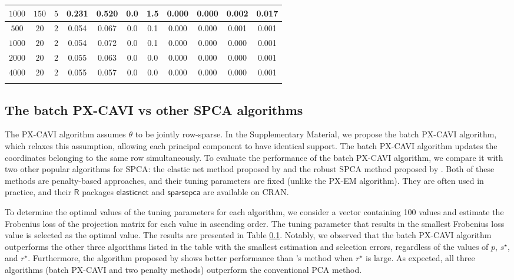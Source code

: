 \documentclass[pdftex, noinfoline, letter]{imsart}
\theoremstyle{plain}
\begin{document}
\begin{table}[h!]
\begin{adjustwidth}{-.9in}{-.9in}
{\begin{tabular}{ccc|cc|cc|cc|cc}
    $1000$ & $150$ & $5$ &
    0.231 & 0.520  &
    0.0 &  1.5 &
    0.000 & 0.000 & 0.002 & 0.017\\   
\hline 
    $500$ & $20$ & $2$  &
    0.054 & 0.067 &
    0.0 &  0.1 &
    0.000 & 0.000 & 0.001 & 0.001\\
    $1000$ & $20$ & $2$ &
    0.054 & 0.072 &
    0.0 &  0.1 &
    0.000 & 0.000 & 0.000 & 0.001\\
    $2000$ & $20$ & $2$ &
    0.055 & 0.063 &
    0.0 &  0.0  & 
    0.000 & 0.000 & 0.000 & 0.001\\
    $4000$ & $20$ & $2$  &
    0.055 & 0.057 &
    0.0 & 0.0 & 
    0.000 & 0.000 & 0.000 & 0.001\\
\Xhline{2\arrayrulewidth}    
\end{tabular}  
}
\end{adjustwidth}
\end{table}



\subsection{The batch PX-CAVI vs other SPCA algorithms}
\label{sim-3}
The PX-CAVI algorithm assumes $\theta$ to be jointly row-sparse. In the Supplementary Material, we propose the batch PX-CAVI algorithm, which relaxes this assumption, allowing each principal component to have identical support. The batch PX-CAVI algorithm updates the coordinates belonging to the same row simultaneously. To evaluate the performance of the batch PX-CAVI algorithm, we compare it with two other popular algorithms for SPCA: the elastic net method proposed by \citet{zou06} and the robust SPCA method proposed by \citet{erichson20}. Both of these methods are penalty-based approaches, and their tuning parameters are fixed (unlike the PX-EM algorithm). They are often used in practice, and their $\mathsf{R}$ packages $\mathsf{elasticnet}$ and $\mathsf{sparsepca}$ are available on CRAN.

To determine the optimal values of the tuning parameters for each algorithm, we consider a vector containing 100 values and estimate the Frobenius loss of the projection matrix for each value in ascending order. The tuning parameter that results in the smallest Frobenius loss value is selected as the optimal value.
The results are presented in Table \ref{sim-3}. Notably, we observed that the batch PX-CAVI algorithm outperforms the other three algorithms listed in the table with the smallest estimation and selection errors, regardless of the values of $p$, $s^\star$, and $r^\star$. Furthermore, the algorithm proposed by \citet{zou06} shows better performance than \citet{erichson20}'s method when $r^\star$ is large. As expected, all three algorithms (batch PX-CAVI and two penalty methods) outperform the conventional PCA method.
\end{document}
